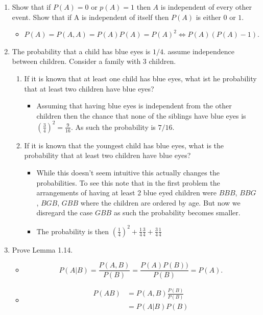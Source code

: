\documentclass{article}
\begin{document}
\begin{enumerate}
\begin{enumerate}
		\end{enumerate}
	\item Show that if $P(A) = 0$ or $p(A) = 1$ then $A$ is independent of every other event. Show that if A is independent of itself then $P(A)$ is either $0$ or $1$.
		\begin{itemize}
			\item $P(A) = P(A, A) = P(A)P(A) = P(A)^2 \iff P(A)(P(A) - 1).$
		\end{itemize}
	\item The probability that a child has blue eyes is $1 / 4$. assume independence between children. Consider a family with $3$ children.
		\begin{enumerate}
			\item If it is known that at least one child has blue eyes, what ist he probability that at least two children have blue eyes?
				\begin{itemize}
					\item Assuming that having blue eyes is independent from the other children then the chance that none of the siblings have blue eyes is $\left(\frac{3}{4}\right)^2 = \frac{9}{16}$. As such the probability is $7 / 16$. 
				\end{itemize}
			\item If it is known that the youngest child has blue eyes, what is the probability that at least two children have blue eyes?
				\begin{itemize}
					\item While this doesn't seem intuitive this actually changes the probabilities. To see this note that in the first problem the arrangements of having at least 2 blue eyed children were $BBB$, $BBG$, $BGB$, $GBB$ where the children are ordered by age. But now we disregard the case $GBB$ as such the probability becomes smaller.
					\item The probability is then $\left(\frac{1}{4}\right)^2 + \frac{1}{4} \frac{3}{4} + \frac{3}{4}\frac{1}{4}$
				\end{itemize}
		\end{enumerate}
	\item Prove Lemma 1.14.
		\begin{itemize}
			\item
			$$
			P(A|B) = \frac{P(A, B)}{P(B)} = \frac{P(A)P(B))}{P(B)} = P(A).
			$$
			\item
			$$
			\begin{aligned}
			P(AB) &= P(A, B) \frac{P(B)}{P(B)} \\
			&= P(A|B) P(B) \\

\end{aligned}$$
\end{itemize}
\end{enumerate}
\end{document}
